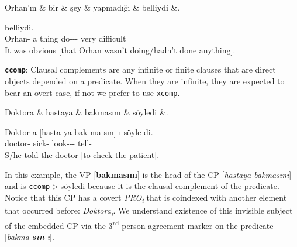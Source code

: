 \documentclass[11pt,a4paper]{article}
\begin{document}
\begin{exe}
\ex \label{csubj}
\begin{dependency}
\begin{deptext}[column sep=0.24cm]
Orhan'ın \& bir \& şey \& yapmadığı \& belliydi \&. \\
\end{deptext}
\end{dependency}

 belliydi. \\
Orhan-\Gen{} a thing do-\Neg{}-\Nmlz{}-\Tsg{} very difficult \\
\glt It was obvious [that Orhan wasn’t doing/hadn’t done anything].
\end{exe}

\textbf{\texttt{ccomp}}:
Clausal complements are any infinite or finite clauses that are direct objects depended on a predicate. When they are infinite, they are expected to bear an overt case, if not we prefer to use \texttt{xcomp}.

\begin{exe}
\ex \label{csubj}
\begin{dependency}
\begin{deptext}[column sep=0.24cm]
Doktora \& hastaya \& bakmasını \& söyledi \&. \\
\end{deptext}
\end{dependency}

\gll Doktor-a [hasta-ya bak-ma-sın]-ı söyle-di. \\
doctor-\Dat{} sick-\Dat{} look-\Nmlz{}-\Tsg{}-\Acc{} tell-\Pst{} \\
\glt S/he told the doctor [to check the patient].
\end{exe} 

In this example, the VP [\textbf{bakmasını}] is the head of the CP [\textit{hastaya bakmasını}] and is \texttt{ccomp}$>$söyledi because it is the clausal complement of the predicate. Notice that this CP has a covert \textit{PRO\textsubscript{i}} that is coindexed with another element that occurred before: \textit{Doktora\textsubscript{i}}. We understand existence of this invisible subject of the embedded CP via the 3\textsuperscript{rd} person agreement marker on the predicate [\textit{bakma-\textbf{sın}-ı}].
\end{document}
